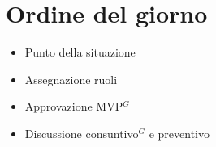 \section*{Ordine del giorno}

\begin{itemize}
	\item Punto della situazione
	\item Assegnazione ruoli
	\item Approvazione MVP$^G$
	\item Discussione consuntivo$^G$ e preventivo
\end{itemize}


